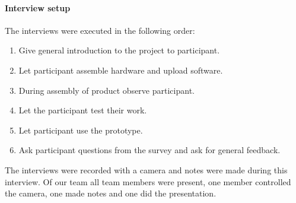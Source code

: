 \documentclass[conference]{IEEEtran}
\begin{document}
	\paragraph{Interview setup} The interviews were executed in the following order:
		\begin{enumerate}
			\item Give general introduction to the project to participant.
			\item Let participant assemble hardware and upload software.
			\item During assembly of product observe participant.
			\item Let the participant test their work.
			\item Let participant use the prototype.
			\item Ask participant questions from the survey and ask for general feedback.
		\end{enumerate}
		The interviews were recorded with a camera and notes were made during this interview. Of our team all team members were present, one member controlled the camera, one made notes and one did the presentation.
\end{document}

